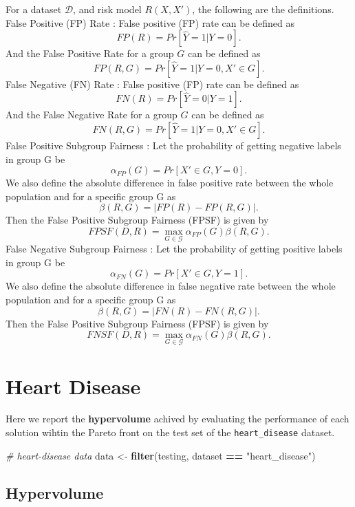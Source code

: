\documentclass[
]{book}
\newenvironment{Shaded}{\begin{snugshade}}{\end{snugshade}}
\newcommand{\CommentTok}[1]{\textcolor[rgb]{0.56,0.35,0.01}{\textit{#1}}}
\newcommand{\FunctionTok}[1]{\textcolor[rgb]{0.13,0.29,0.53}{\textbf{#1}}}
\newcommand{\NormalTok}[1]{#1}
\newcommand{\OtherTok}[1]{\textcolor[rgb]{0.56,0.35,0.01}{#1}}
\newcommand{\SpecialCharTok}[1]{\textcolor[rgb]{0.81,0.36,0.00}{\textbf{#1}}}
\newcommand{\StringTok}[1]{\textcolor[rgb]{0.31,0.60,0.02}{#1}}
\begin{document}
For a dataset \(\mathcal{D}\), and risk model \(R(X,X')\), the following are the definitions.
False Positive (FP) Rate
: False positive (FP) rate can be defined as
\[FP(R) = Pr[\hat{Y}=1|Y=0].\]
And the False Positive Rate for a group \(G\) can be defined as
\[FP(R,G) = Pr[\hat{Y}=1|Y=0, X'\in G].\]
False Negative (FN) Rate
: False positive (FP) rate can be defined as
\[FN(R) = Pr[\hat{Y}=0|Y=1].\]
And the False Negative Rate for a group \(G\) can be defined as
\[FN(R, G) = Pr[\hat{Y}=1|Y=0, X'\in G].\]
False Positive Subgroup Fairness
: Let the probability of getting negative labels in group G be
\[\alpha_{FP}(G) = Pr[X'\in G, Y=0].\]
We also define the absolute difference in false positive rate between the whole population and for a specific group G as
\[\beta(R,G)=|FP(R)-FP(R,G)|.\]
Then the False Positive Subgroup Fairness (FPSF) is given by
\[FPSF(D, R) = \max_{G\in\mathcal{G}}\alpha_{FP}(G)\beta(R,G).\]
False Negative Subgroup Fairness
: Let the probability of getting positive labels in group G be
\[\alpha_{FN}(G) = Pr[X'\in G, Y=1].\]
We also define the absolute difference in false negative rate between the whole population and for a specific group G as
\[\beta(R,G)=|FN(R)-FN(R,G)|.\]
Then the False Positive Subgroup Fairness (FPSF) is given by
\[FNSF(D, R) = \max_{G\in\mathcal{G}}\alpha_{FN}(G)\beta(R,G).\]

\hypertarget{heart-disease}{%
\chapter{Heart Disease}\label{heart-disease}}

Here we report the \textbf{hypervolume} achived by evaluating the performance of each solution wihtin the Pareto front on the test set of the \texttt{heart\_disease} dataset.

\begin{Shaded}
\begin{Highlighting}[]
\CommentTok{\# heart{-}disease data}
\NormalTok{data }\OtherTok{\textless{}{-}} \FunctionTok{filter}\NormalTok{(testing, dataset }\SpecialCharTok{==} \StringTok{"heart\_disease"}\NormalTok{)}
\end{Highlighting}
\end{Shaded}

\hypertarget{hypervolume}{%
\section{Hypervolume}\label{hypervolume}}
\end{document}
